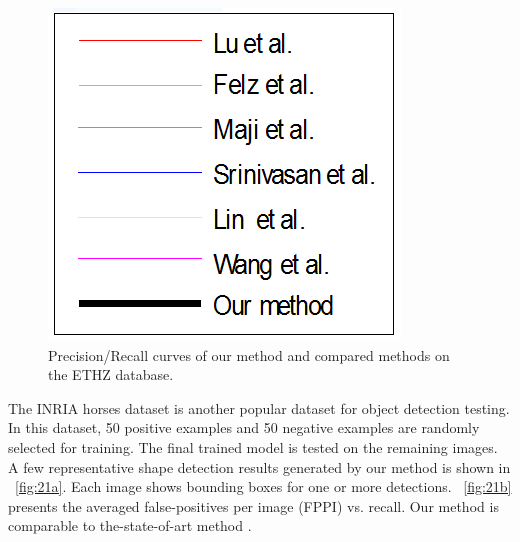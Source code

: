 \documentclass{article}
\begin{document}
\begin{figure}[!t]
\includegraphics[width=0.4\linewidth]{images/fig17f.png}
\caption{Precision/Recall curves of our method and compared methods on the ETHZ database.}
\label{fig:17}
\end{figure}

The INRIA horses dataset is another popular dataset for object detection testing. 
In this dataset, 50 positive examples and 50 negative examples are randomly selected for training. 
The final trained model is tested on the remaining images.
A few representative shape detection results generated by our method is shown in \figurename~\ref{fig:21a}. 
Each image shows bounding boxes for one or more detections. 
\figurename~\ref{fig:21b} presents the averaged false-positives per image (FPPI) vs. recall.
Our method is comparable to the-state-of-art method \cite{luo2010,jurie2004,ferrari2007,yarlagadda2010,lin2012}.
\end{document}
